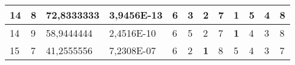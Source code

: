 \documentclass[conference]{IEEEtran}
\begin{document}
\begin{table*}[]
\begin{tabular}{|llll|llllllll|}
\multicolumn{1}{|l|}{14}                                                    & \multicolumn{1}{l|}{8}                                                        & \multicolumn{1}{l|}{72,8333333}                                                   & 3,9456E-13                     & \multicolumn{1}{l|}{6}                                                  & \multicolumn{1}{l|}{3}                                                  & \multicolumn{1}{l|}{2}                                                  & \multicolumn{1}{l|}{7}                                                  & \multicolumn{1}{l|}{\textbf{1}}                                         & \multicolumn{1}{l|}{5}                                                  & \multicolumn{1}{l|}{4}                                                  & 8                          \\ \hline
\multicolumn{1}{|l|}{14}                                                    & \multicolumn{1}{l|}{9}                                                        & \multicolumn{1}{l|}{58,9444444}                                                   & 2,4516E-10                     & \multicolumn{1}{l|}{6}                                                  & \multicolumn{1}{l|}{5}                                                  & \multicolumn{1}{l|}{2}                                                  & \multicolumn{1}{l|}{7}                                                  & \multicolumn{1}{l|}{\textbf{1}}                                         & \multicolumn{1}{l|}{4}                                                  & \multicolumn{1}{l|}{3}                                                  & 8                          \\ \hline
\multicolumn{1}{|l|}{15}                                                    & \multicolumn{1}{l|}{7}                                                        & \multicolumn{1}{l|}{41,2555556}                                                   & 7,2308E-07                     & \multicolumn{1}{l|}{6}                                                  & \multicolumn{1}{l|}{2}                                                  & \multicolumn{1}{l|}{\textbf{1}}                                         & \multicolumn{1}{l|}{8}                                                  & \multicolumn{1}{l|}{5}                                                  & \multicolumn{1}{l|}{4}                                                  & \multicolumn{1}{l|}{3}                                                  & 7                          \\ \hline

\end{tabular}
\end{table*}
\end{document}

